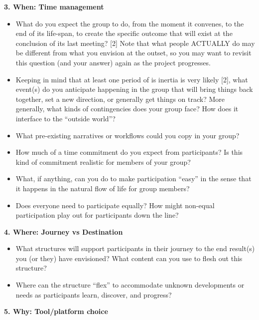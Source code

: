 \textbf{3. When: Time management}

\begin{itemize}
\tightlist
\item
  What do you expect the group to do, from the moment it convenes, to
  the end of its life-span, to create the specific outcome that will
  exist at the conclusion of its last meeting? {[}2{]} Note that what
  people ACTUALLY do may be different from what you envision at the
  outset, so you may want to revisit this question (and your answer)
  again as the project progresses.
\item
  Keeping in mind that at least one period of is inertia is very likely
  {[}2{]}, what event(s) do you anticipate happening in the group that
  will bring things back together, set a new direction, or generally get
  things on track? More generally, what kinds of contingencies does your
  group face? How does it interface to the ``outside world''?
\item
  What pre-existing narratives or workflows could you copy in your
  group?
\item
  How much of a time commitment do you expect from participants? Is this
  kind of commitment realistic for members of your group?
\item
  What, if anything, can you do to make participation ``easy'' in the
  sense that it happens in the natural flow of life for group members?
\item
  Does everyone need to participate equally? How might non-equal
  participation play out for participants down the line?
\end{itemize}

\textbf{4. Where: Journey vs Destination}

\begin{itemize}
\tightlist
\item
  What structures will support participants in their journey to the end
  result(s) you (or they) have envisioned? What content can you use to
  flesh out this structure?
\item
  Where can the structure ``flex'' to accommodate unknown developments
  or needs as participants learn, discover, and progress?
\end{itemize}

\textbf{5. Why: Tool/platform choice}


